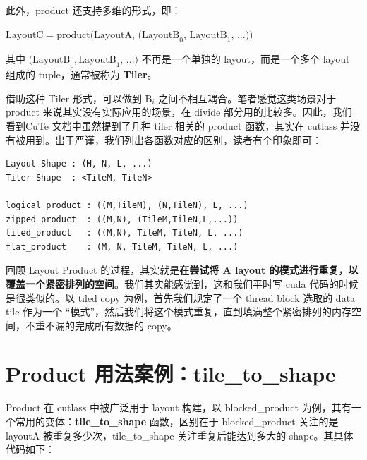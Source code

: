 此外，product 还支持多维的形式，即：

$\text{LayoutC} = \text{product(LayoutA, (LayoutB}_0\text{, LayoutB}_1\text{, ...))}$

其中 $ \text{(LayoutB}_0,  \text{LayoutB}_1 \text{, ...)}$ 不再是一个单独的 layout，而是一个多个 layout 组成的 tuple，通常被称为 \textbf{Tiler}。

借助这种 Tiler 形式，可以做到 $\text{B}_i$ 之间不相互耦合。笔者感觉这类场景对于 product 来说其实没有实际应用的场景，在 divide 部分用的比较多。因此，我们看到CuTe 文档中虽然提到了几种 tiler 相关的 product 函数，其实在 cutlass 并没有被用到。出于严谨，我们列出各函数对应的区别，读者有个印象即可：

\begin{lstlisting}
Layout Shape : (M, N, L, ...)
Tiler Shape  : <TileM, TileN>

logical_product : ((M,TileM), (N,TileN), L, ...)
zipped_product  : ((M,N), (TileM,TileN,L,...))
tiled_product   : ((M,N), TileM, TileN, L, ...)
flat_product    : (M, N, TileM, TileN, L, ...)
\end{lstlisting}

回顾 Layout Product 的过程，其实就是\textbf{在尝试将 A layout 的模式进行重复，以覆盖一个紧密排列的空间}。我们其实能感觉到，这和我们平时写 cuda 代码的时候是很类似的。以 tiled copy 为例，首先我们规定了一个 thread block 选取的 data tile 作为一个 “模式”，然后我们将这个模式重复，直到填满整个紧密排列的内存空间，不重不漏的完成所有数据的 copy。

\section{Product 用法案例：tile\_to\_shape}

Product 在 cutlass 中被广泛用于 layout 构建，以 blocked\_product 为例，其有一个常用的变体：\textbf{tile\_to\_shape} 函数，区别在于 blocked\_product 关注的是 layoutA 被重复多少次，tile\_to\_shape 关注重复后能达到多大的 shape。其具体代码如下：

